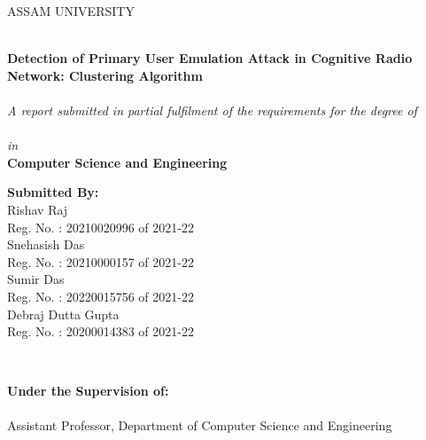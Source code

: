 \documentclass[10pt, oneside, article]{Thesis} %
\begin{document}
\begin{titlepage}
\vspace{-1cm}
\begin{center}
{\scshape\LARGE ASSAM UNIVERSITY \par}\vspace{0cm}

\HRule \\[0.4cm] %
{\huge \bfseries Detection of Primary User Emulation
Attack in Cognitive Radio Network: Clustering Algorithm}\\[.1cm] %
\HRule \\[1.5cm] %
\vspace{-.8cm}
\large \textit{A report submitted in partial fulfilment of the requirements for the degree of \\ \textbf{\degreename}}\\[0.3cm] %
\vspace{-.4cm}\textit{in }\\ \textbf{Computer Science and Engineering}

 
\begin{minipage}[t]{0.8\textwidth}
\begin{center}
  \textbf{Submitted By:}\\
Rishav Raj \\ Reg. No. : 20210020996\hspace{10pt}   of 2021-22\\
Snehasish Das\\ Reg. No. : 20210000157\hspace{10pt} of 2021-22\\
Sumir Das \\ Reg. No. : 20220015756\hspace{10pt}   of 2021-22\\
Debraj Dutta Gupta\\ Reg. No. : 20200014383\hspace{10pt} of 2021-22
\end{center} \large


\end{minipage}
\\[0.8cm]
\begin{minipage}[t]{0.8\textwidth}
\begin{center} \large
\textbf{Under the Supervision of:} \\
{\supname}\\
Assistant Professor, Department of Computer Science and Engineering
\end{center}
\end{minipage}\\[1.5cm]
 


\end{center}
\end{titlepage}
\end{document}
